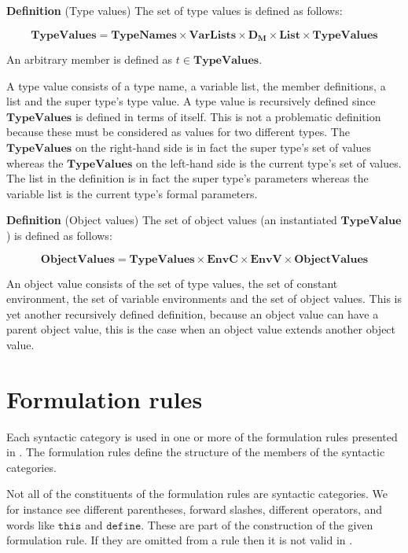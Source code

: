 \textbf{Definition} (Type values) \hspace{0.5cm} The set of type values is
defined as follows:

\[
  \mathbf{TypeValues} = \mathbf{TypeNames} \times \mathbf{VarLists} \times
  \mathbf{D_{M}} \times \mathbf{List} \times \mathbf{TypeValues }
\]

An arbitrary member is defined as $t \in \mathbf{TypeValues}$.

A type value consists of a type name, a variable list, the member definitions,
a list and the super type's type value. A type value is recursively defined since
$\mathbf{TypeValues}$ is defined in terms of itself. This is not a problematic
definition because these must be considered as values for two different types.
The $\mathbf{TypeValues}$ on the right-hand side is in fact the super type's set
of values whereas the $\mathbf{TypeValues}$ on the left-hand side is the current
type's set of values.  The list in the definition is in fact the super type's
parameters whereas the variable list is the current type's formal parameters.

\textbf{Definition} (Object values) \hspace{0.5cm} The set of object values (an
instantiated $\mathbf{TypeValue}$) is defined as follows:

\[
  \mathbf{ObjectValues} = \mathbf{TypeValues} \times \mathbf{EnvC} \times
  \mathbf{EnvV} \times \mathbf{ObjectValues}
\]

An object value consists of the set of type values, the set of constant
environment, the set of variable environments and the set of object values. This
is yet another recursively defined definition, because an object value can have
a parent object value, this is the case when an object value extends another
object value. 

\section{Formulation rules}
Each syntactic category is used in one or more of the formulation rules
presented in . The formulation rules define the structure
of the members of the syntactic categories. 

Not all of the constituents of the formulation rules are syntactic categories.
We for instance see different parentheses, forward slashes, different operators,
and words like $\texttt{this}$ and $\texttt{define}$. These are part of the
construction of the given formulation rule. If they are omitted from a rule then
it is not valid in \productname{}.

